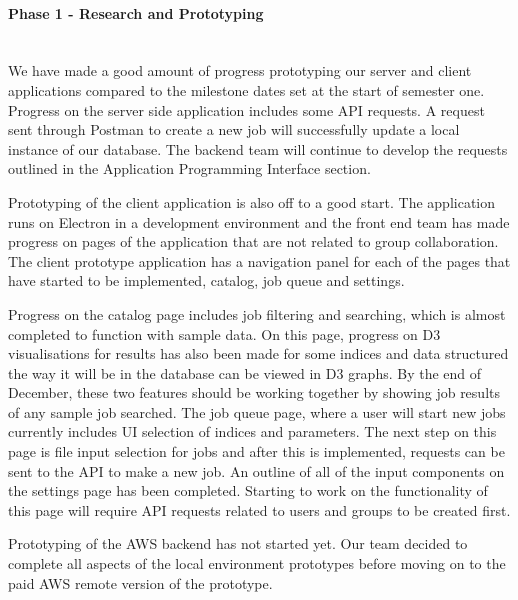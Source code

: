 \paragraph{Phase 1 - Research and Prototyping} \mbox{}\\[\paragraphheaderspace]
We have made a good amount of progress prototyping our server and client applications compared to the milestone dates set at the start of semester one. Progress on the server side application includes some API requests. A request sent through Postman to create a new job will successfully update a local instance of our database. The backend team will continue to develop the requests outlined in the Application Programming Interface section.\par
Prototyping of the client application is also off to a good start. The application runs on Electron in a development environment and the front end team has made progress on pages of the application that are not related to group collaboration. The client prototype application has a navigation panel for each of the pages that have started to be implemented, catalog, job queue and settings.\par
Progress on the catalog page includes job filtering and searching, which is almost completed to function with sample data. On this page, progress on D3 visualisations for results has also been made for some indices and data structured the way it will be in the database can be viewed in D3 graphs. By the end of December, these two features should be working together by showing job results of any sample job searched. The job queue page, where a user will start new jobs currently includes UI selection of indices and parameters. The next step on this page is file input selection for jobs and after this is implemented, requests can be sent to the API to make a new job. An outline of all of the input components on the settings page has been completed. Starting to work on the functionality of this page will require API requests related to users and groups to be created first.\par
Prototyping of the AWS backend has not started yet. Our team decided to complete all aspects of the local environment prototypes before moving on to the paid AWS remote version of the prototype.\par

